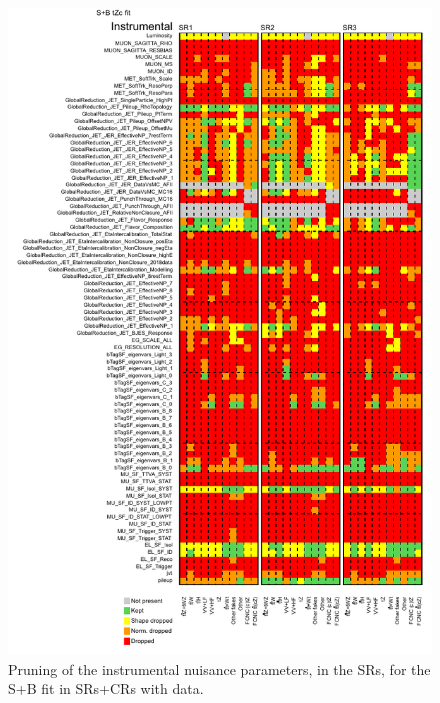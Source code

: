 \begin{figure}[htbp]
	\centering
	\includegraphics[width=.9\textwidth]{Chapters/CH8/figures/SPLUSB_CRSR_DL1rc_unblind/Pruning_split1}
	\caption{Pruning of the instrumental nuisance parameters, in the SRs, for the S+B \tZc fit in SRs+CRs with data.}%
	\label{fig:stat:tzc:splusb:crsr:pruning_unb1}
\end{figure}
